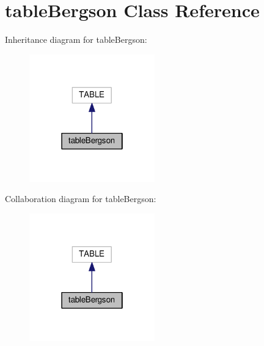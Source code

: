 \hypertarget{classtableBergson}{}\section{table\+Bergson Class Reference}
\label{classtableBergson}


Inheritance diagram for table\+Bergson\+:
\nopagebreak
\begin{figure}[H]
\begin{center}
\leavevmode
\includegraphics[width=154pt]{classtableBergson__inherit__graph}
\end{center}
\end{figure}


Collaboration diagram for table\+Bergson\+:
\nopagebreak
\begin{figure}[H]
\begin{center}
\leavevmode
\includegraphics[width=154pt]{classtableBergson__coll__graph}
\end{center}
\end{figure}
